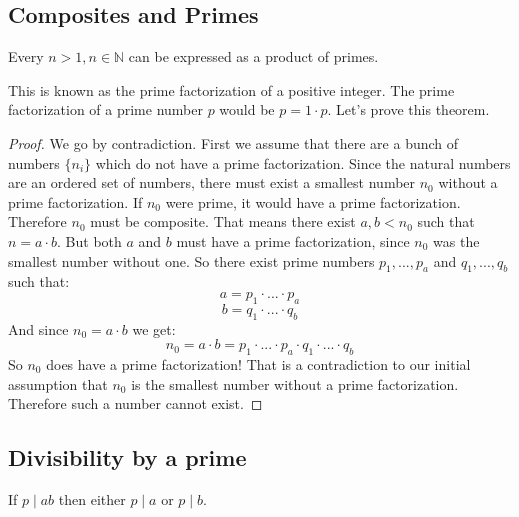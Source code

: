 \documentclass{article}
\theoremstyle{definition}
\begin{document}
\subsection{Composites and Primes}
\begin{theorem}
    Every $n>1, n \in \mathbb{N}$ can be expressed as a product of primes. 
\end{theorem}
This is known as the prime factorization of a positive integer. The prime factorization of a prime number $p$ would be $p = 1 \cdot p$. Let's prove this theorem.
\begin{proof}
    We go by contradiction. First we assume that there are a bunch of numbers $\{ n_i\}$ which do not have a prime factorization. Since the natural numbers are an ordered set of numbers, there must exist a smallest number $n_0$ without a prime factorization.
    If $n_0$ were prime, it would have a prime factorization. Therefore $n_0$ must be composite. That means there exist $a,b<n_0$ such that $n=a\cdot b$. But both $a$ and $b$ must have a prime factorization, since $n_0$ was the smallest number without one. So there exist prime numbers $p_1,...,p_a$ and $q_1,...,q_b$ such that:
    \begin{equation}
        a = p_1 \cdot ... \cdot p_a 
    \end{equation}   
    \begin{equation}
        b = q_1 \cdot ... \cdot q_b
    \end{equation}
    And since $n_0 = a \cdot b$ we get:
    \begin{equation}
        n_0 = a \cdot b = p_1 \cdot ... \cdot p_a \cdot q_1 \cdot ... \cdot q_b
    \end{equation}
    So $n_0$ does have a prime factorization! That is a contradiction to our initial assumption that $n_0$ is the smallest number without a prime factorization. Therefore such a number cannot exist. 
\end{proof}

\subsection{Divisibility by a prime}
\begin{theorem}
\label{theorem}
    If $p \mid ab$ then either $p \mid a$ or $p \mid b$.
\end{theorem}
\end{document}
